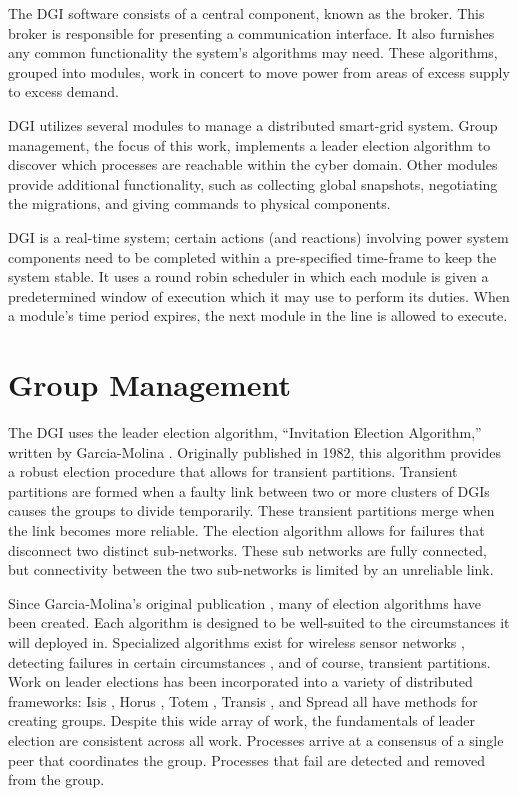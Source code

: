 The DGI software consists of a central component, known as the broker.
This broker is responsible for presenting a communication interface.
It also furnishes any common functionality the system's algorithms may need.
These algorithms, grouped into modules, work in concert to move power from areas of excess supply to excess demand.

DGI utilizes several modules to manage a distributed smart-grid system.
Group management, the focus of this work, implements a leader election algorithm to discover which processes are reachable within the cyber domain.
Other modules provide additional functionality, such as collecting global snapshots, negotiating the migrations, and giving commands to physical components.

DGI is a real-time system; certain actions (and reactions) involving power system components need to be completed within a pre-specified time-frame to keep the system stable.
It uses a round robin scheduler in which each module is given a predetermined window of execution which it may use to perform its duties.
When a module's time period expires, the next module in the line is allowed to execute. 

\section{Group Management}
The DGI uses the leader election algorithm, ``Invitation Election Algorithm,'' written by Garcia-Molina \cite{INVITATIONELECTION}.
Originally published in 1982, this algorithm provides a robust election  procedure that allows for transient partitions.
Transient partitions are formed when a faulty link between two or more clusters of DGIs causes the groups to divide temporarily.
These transient partitions merge when the link becomes more reliable.
The election algorithm allows for failures that disconnect two distinct sub-networks.
These sub networks are fully connected, but connectivity between the two sub-networks is limited by an unreliable link.

Since Garcia-Molina's original publication \cite{INVITATIONELECTION}, many of election algorithms have been created. 
Each algorithm is designed to be well-suited to the circumstances it will deployed in.
Specialized algorithms exist for wireless sensor networks \cite{LE-WSN-1}\cite{LE-WSN-2}, detecting failures in certain circumstances \cite{LE-SPECIALCIRCUMSTANCES-1}\cite{LE-SPECIALCIRCUMSTANCES-2}, and of course, transient partitions.
Work on leader elections has been incorporated into a variety of distributed frameworks: Isis \cite{ISISTOOLKIT}, Horus \cite{HORUSTOOLKIT}, Totem \cite{TOTEMTOOLKIT}, Transis \cite{TRANSISTOOLKIT}, and Spread \cite{SPREADTOOLKIT} all have methods for creating groups.
Despite this wide array of work, the fundamentals of leader election are consistent
across all work.
Processes arrive at a consensus of a single peer that coordinates the group.
Processes that fail are detected and removed from the group. 

